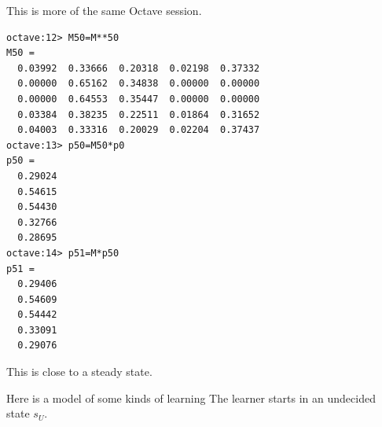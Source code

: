 \begin{exercises}
\begin{answer}
\begin{exparts}
\begin{center}
       \end{center} 
        \partsitem This is more of the same Octave session.
\begin{lstlisting}
octave:12> M50=M**50
M50 =
  0.03992  0.33666  0.20318  0.02198  0.37332
  0.00000  0.65162  0.34838  0.00000  0.00000
  0.00000  0.64553  0.35447  0.00000  0.00000
  0.03384  0.38235  0.22511  0.01864  0.31652
  0.04003  0.33316  0.20029  0.02204  0.37437
octave:13> p50=M50*p0
p50 =
  0.29024
  0.54615
  0.54430
  0.32766
  0.28695
octave:14> p51=M*p50
p51 =
  0.29406
  0.54609
  0.54442
  0.33091
  0.29076
\end{lstlisting}
        This is close to a steady state.
      \end{exparts}
    \end{answer}
  \item 
    \cite{Wickens} %
    Here is a  model of some kinds of learning 
    The learner starts in an undecided state $s_U$.

\end{exercises}
